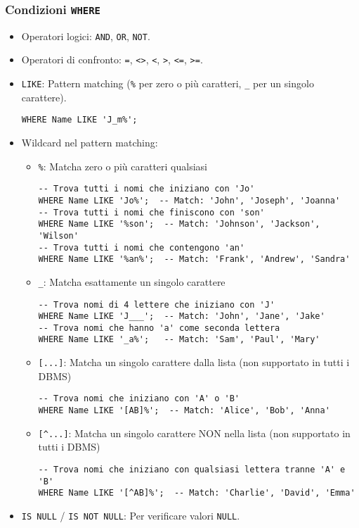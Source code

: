 	\subsubsection{Condizioni \texttt{WHERE}}
	\begin{itemize}
		\item Operatori logici: \texttt{AND}, \texttt{OR}, \texttt{NOT}.
		\item Operatori di confronto: \texttt{=}, \texttt{<>}, \texttt{<}, \texttt{>}, \texttt{<=}, \texttt{>=}.
		\item \texttt{LIKE}: Pattern matching (\texttt{\%} per zero o più caratteri, \texttt{\_} per un singolo carattere).
		\begin{verbatim}
WHERE Name LIKE 'J_m%';
		\end{verbatim}
		\item Wildcard nel pattern matching:
		\begin{itemize}
			\item \texttt{\%}: Matcha zero o più caratteri qualsiasi
			\begin{verbatim}
-- Trova tutti i nomi che iniziano con 'Jo'
WHERE Name LIKE 'Jo%';  -- Match: 'John', 'Joseph', 'Joanna'
-- Trova tutti i nomi che finiscono con 'son'
WHERE Name LIKE '%son';  -- Match: 'Johnson', 'Jackson', 'Wilson'
-- Trova tutti i nomi che contengono 'an'
WHERE Name LIKE '%an%';  -- Match: 'Frank', 'Andrew', 'Sandra'
			\end{verbatim}
			\item \texttt{\_}: Matcha esattamente un singolo carattere
			\begin{verbatim}
-- Trova nomi di 4 lettere che iniziano con 'J'
WHERE Name LIKE 'J___';  -- Match: 'John', 'Jane', 'Jake'
-- Trova nomi che hanno 'a' come seconda lettera
WHERE Name LIKE '_a%';   -- Match: 'Sam', 'Paul', 'Mary'
			\end{verbatim}
			\item \texttt{[...]}: Matcha un singolo carattere dalla lista (non supportato in tutti i DBMS)
			\begin{verbatim}
-- Trova nomi che iniziano con 'A' o 'B'
WHERE Name LIKE '[AB]%';  -- Match: 'Alice', 'Bob', 'Anna'
			\end{verbatim}
			\item \texttt{[\^{}...]}: Matcha un singolo carattere NON nella lista (non supportato in tutti i DBMS)
			\begin{verbatim}
-- Trova nomi che iniziano con qualsiasi lettera tranne 'A' e 'B'
WHERE Name LIKE '[^AB]%';  -- Match: 'Charlie', 'David', 'Emma'
			\end{verbatim}
		\end{itemize}
		\item \texttt{IS NULL} / \texttt{IS NOT NULL}: Per verificare valori \texttt{NULL}.
	\end{itemize}
	
